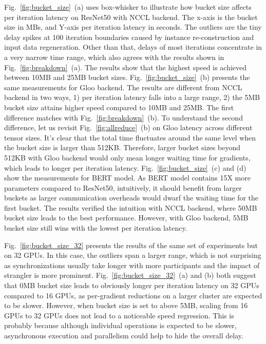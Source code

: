 Fig.~\ref{fig:bucket_size}~(a) uses box-whisker to illustrate how bucket size affects per iteration latency on ResNet50 with NCCL backend. The x-axis is the bucket size in MBs, and Y-axis per iteration latency in seconds. The outliers are the tiny delay spikes at 100 iteration boundaries caused by  instance re-construction and input data regeneration. Other than that, delays of most iterations concentrate in a very narrow time range, which also agrees with the results shown in Fig.~\ref{fig:breakdown}~(a). The results show that the highest speed is achieved between 10MB and 25MB bucket sizes. Fig.~\ref{fig:bucket_size}~(b) presents the same measurements for Gloo backend. The results are different from NCCL backend in two ways, 1) per iteration latency falls into a large range, 2) the 5MB bucket size attains higher speed compared to 10MB and 25MB. The first difference matches with Fig.~\ref{fig:breakdown}~(b). To understand the second difference, let us revisit Fig.~\ref{fig:allreduce}~(b) on Gloo  latency across different tensor sizes. It's clear that the total  time fluctuates around the same level when the bucket size is larger than 512KB. Therefore, larger bucket sizes beyond 512KB with Gloo backend would only mean longer waiting time for gradients, which leads to longer per iteration latency. Fig.~\ref{fig:bucket_size}~(c) and (d) show the measurements for BERT model. As BERT model contains 15X more parameters compared to ResNet50, intuitively, it should benefit from larger buckets as larger communication overheads would dwarf the waiting time for the first bucket. The results verified the intuition with NCCL backend, where 50MB bucket size leads to the best performance. However, with Gloo backend, 5MB bucket size still wins with the lowest per iteration latency. 


Fig.~\ref{fig:bucket_size_32} presents the results of the same set of experiments but on 32 GPUs. In this case, the outliers span a larger range, which is not surprising as synchronizations usually take longer with more participants and the impact of strangler is more prominent. Fig.~\ref{fig:bucket_size_32}~(a) and (b) both suggest that 0MB bucket size leads to obviously longer per iteration latency on 32 GPUs compared to 16 GPUs, as per-gradient reductions on a larger cluster are expected to be slower. However, when bucket size is set to above 5MB, scaling from 16 GPUs to 32 GPUs does not lead to a noticeable speed regression. This is probably because although individual  operations is expected to be slower, asynchronous execution and parallelism could help to hide the overall delay. 




